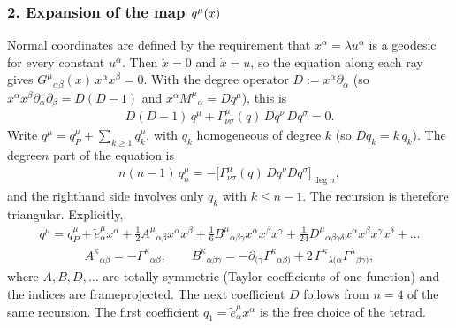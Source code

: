 \documentclass[letterpaper,10pt,english]{jupyterBook}
\begin{document}
\subsubsection{2. Expansion of the map \protect\(q^\mu(x)\protect\)}
\label{\detokenize{ch/relativity-general/geodesics-linearization:expansion-of-the-map-q-mu-x}}
\sphinxAtStartPar
Normal coordinates are defined by the requirement that \(x^\alpha=\lambda u^\alpha\) is a geodesic for every constant \(u^\alpha\). Then \(\ddot x=0\) and \(\dot x=u\), so the equation along each ray gives \(G^\mu{}_{\alpha\beta}(x)\,x^\alpha x^\beta=0\). With the degree operator \(D:=x^\alpha\partial_\alpha\) (so \(x^\alpha x^\beta\partial_\alpha\partial_\beta=D(D-1)\) and \(x^\alpha M^\mu{}_\alpha=Dq^\mu\)), this is
\begin{equation*}
\begin{split}
D(D-1)\,q^\mu+\Gamma^\mu_{\nu\sigma}(q)\,Dq^\nu\,Dq^\sigma=0 .
\end{split}
\end{equation*}
\sphinxAtStartPar
Write \(q^\mu=q_P^\mu+\sum_{k\ge1}q^\mu_k\), with \(q_k\) homogeneous of degree \(k\) (so \(Dq_k=k\,q_k\)). The degree\sphinxhyphen{}\(n\) part of the equation is
\begin{equation*}
\begin{split}
n(n-1)\,q_n^\mu=-\Big[\Gamma^\mu_{\nu\sigma}(q)\,Dq^\nu Dq^\sigma\Big]_{\deg n},
\end{split}
\end{equation*}
\sphinxAtStartPar
and the right\sphinxhyphen{}hand side involves only \(q_k\) with \(k\le n-1\). The recursion is therefore triangular. Explicitly,
\begin{equation*}
\begin{split}
q^\mu=q^\mu_P+\tilde e^\mu_\alpha x^\alpha+\tfrac12A^\mu{}_{\alpha\beta}x^\alpha x^\beta+\tfrac16B^\mu{}_{\alpha\beta\gamma}x^\alpha x^\beta x^\gamma+\tfrac1{24}D^\mu{}_{\alpha\beta\gamma\delta}x^\alpha x^\beta x^\gamma x^\delta+\dots
\end{split}
\end{equation*}\begin{equation*}
\begin{split}
A^\kappa{}_{\alpha\beta}=-\Gamma^\kappa{}_{\alpha\beta},\qquad
B^\kappa{}_{\alpha\beta\gamma}=-\partial_{(\gamma}\Gamma^\kappa{}_{\alpha\beta)}+2\,\Gamma^\kappa{}_{\lambda(\alpha}\Gamma^\lambda{}_{\beta\gamma)} ,
\end{split}
\end{equation*}
\sphinxAtStartPar
where \(A,B,D,\dots\) are totally symmetric (Taylor coefficients of one function) and the indices are frame\sphinxhyphen{}projected. The next coefficient \(D\) follows from \(n=4\) of the same recursion. The first coefficient \(q_1=\tilde e^\mu_\alpha x^\alpha\) is the free choice of the tetrad.
\end{document}

